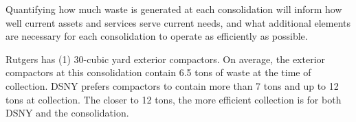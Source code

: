 
    Quantifying how much waste is generated at each consolidation will inform how well current assets and services serve current needs, and what additional elements are necessary for each consolidation to operate as efficiently as possible.
    
    Rutgers has (1) 30-cubic yard exterior compactors. On average, the exterior compactors at this consolidation contain 6.5 tons of waste at the time of collection. DSNY prefers compactors to contain more than 7 tons and up to 12 tons at collection. The closer to 12 tons, the more efficient collection is for both DSNY and the consolidation.